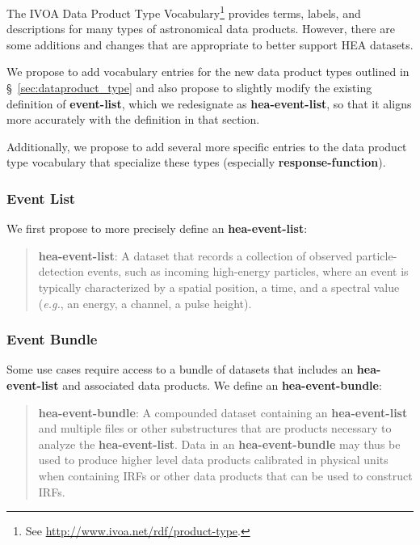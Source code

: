 \documentclass[11pt,a4paper]{ivoa}
\begin{document}
The \gls{IVOA} Data Product Type Vocabulary\footnote{See \url{http://www.ivoa.net/rdf/product-type}.} provides terms, labels, and descriptions for many types of astronomical data products. However, there are some additions and changes that are appropriate to better support \gls{HEA} datasets.

We propose to add vocabulary entries for the new data product types outlined in \S~\ref{sec:dataproduct_type} and also propose to slightly modify the existing definition of {\bf event-list}, which we redesignate as {\bf hea-event-list}, so that it aligns more accurately with the definition in that section. 

 Additionally, we propose to add several more specific entries to the data product type vocabulary that specialize these types (especially {\bf response-function}).


\subsubsection{Event List}

We first propose to more precisely define an {\bf hea-event-list}:

\begin{quote}
{\bf hea-event-list}: A dataset that records a collection of observed particle-detection events, such as incoming high-energy particles, where an event is typically characterized by a spatial position, a time, and a spectral value ({\em e.g.\/}, an energy, a channel, a pulse height).
\end{quote}

\subsubsection{Event Bundle}

Some use cases require access to a bundle of datasets that includes an {\bf hea-event-list} and associated data products.  We define an {\bf hea-event-bundle}:

\begin{quote}
{\bf hea-event-bundle}: A compounded dataset containing an {\bf hea-event-list} and multiple files or other substructures that are products necessary to analyze the {\bf hea-event-list}. Data in an {\bf hea-event-bundle} may thus be used to produce higher level data products calibrated in physical units when containing \glspl{IRF} or other data products that can be used to construct \glspl{IRF}.
\end{quote}
\end{document}
